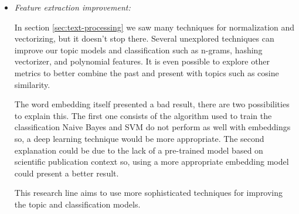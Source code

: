 \begin{itemize}

	\item \textit{Feature extraction improvement:}
	
	In section \ref{sec:text-processing} we saw many techniques for normalization and vectorizing, but it doesn't stop there. Several unexplored techniques can improve our topic models and classification such as n-grams, hashing vectorizer, and polynomial features.
	It is even possible to explore other metrics to better combine the past and present with topics such as cosine similarity.

	The word embedding itself presented a bad result, there are two possibilities to explain this. The first one consists of the algorithm used to train the classification Naive Bayes and SVM do not perform as well with embeddings so, a deep learning technique would be more appropriate. The second explanation could be due to the lack of a pre-trained model based on scientific publication context so, using a more appropriate embedding model could present a better result.
	
	This research line aims to use more sophisticated techniques for improving the topic and classification models.
	
	
\end{itemize}
